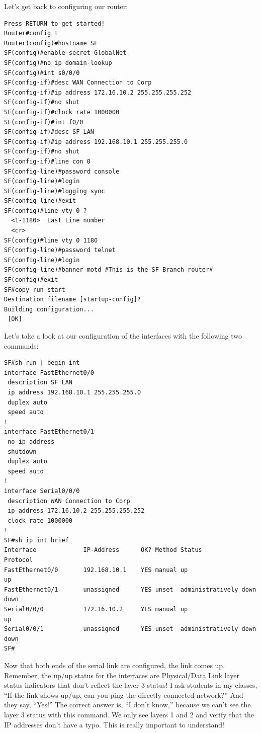 Let's get back to configuring our router:

\begin{verbatim}
Press RETURN to get started!
Router#config t
Router(config)#hostname SF
SF(config)#enable secret GlobalNet
SF(config)#no ip domain-lookup
SF(config)#int s0/0/0
SF(config-if)#desc WAN Connection to Corp
SF(config-if)#ip address 172.16.10.2 255.255.255.252
SF(config-if)#no shut
SF(config-if)#clock rate 1000000
SF(config-if)#int f0/0
SF(config-if)#desc SF LAN
SF(config-if)#ip address 192.168.10.1 255.255.255.0
SF(config-if)#no shut
SF(config-if)#line con 0
SF(config-line)#password console
SF(config-line)#login
SF(config-line)#logging sync
SF(config-line)#exit
SF(config)#line vty 0 ?
  <1-1180>  Last Line number
  <cr>
SF(config)#line vty 0 1180
SF(config-line)#password telnet
SF(config-line)#login
SF(config-line)#banner motd #This is the SF Branch router#
SF(config)#exit
SF#copy run start
Destination filename [startup-config]?
Building configuration...
 [OK]
\end{verbatim}

Let's take a look at our configuration of the interfaces with the
following two commands:

\begin{verbatim}
SF#sh run | begin int
interface FastEthernet0/0
 description SF LAN
 ip address 192.168.10.1 255.255.255.0
 duplex auto
 speed auto
!
interface FastEthernet0/1
 no ip address
 shutdown
 duplex auto
 speed auto
!
interface Serial0/0/0
 description WAN Connection to Corp
 ip address 172.16.10.2 255.255.255.252
 clock rate 1000000
!
SF#sh ip int brief
Interface             IP-Address      OK? Method Status                Protocol
FastEthernet0/0       192.168.10.1    YES manual up                    up
FastEthernet0/1       unassigned      YES unset  administratively down down
Serial0/0/0           172.16.10.2     YES manual up                    up
Serial0/0/1           unassigned      YES unset  administratively down down
SF#
\end{verbatim}

Now that both ends of the serial link are configured, the link comes up.
Remember, the up/up status for the interfaces are Physical/Data Link
layer status indicators that don't reflect the layer 3 status! I ask
students in my classes, ``If the link shows up/up, can you ping the
directly connected network?'' And they say, ``Yes!'' The correct answer
is, ``I don't know,'' because we can't see the layer 3 status with this
command. We only see layers 1 and 2 and verify that the IP addresses
don't have a typo. This is really important to understand!

